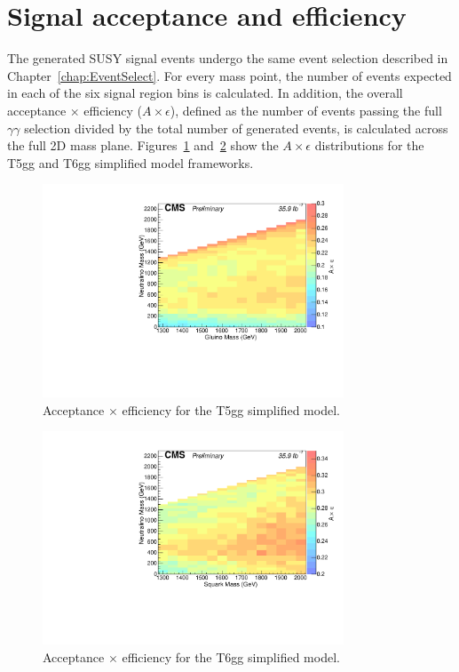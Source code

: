 
\section{Signal acceptance and efficiency}
The generated SUSY signal events undergo the same event selection described in Chapter~\ref{chap:EventSelect}. 
For every mass point, the number of events expected in each of the six signal region bins is calculated. 
In addition, the overall acceptance $\times$ efficiency ($A \times \epsilon$), defined as the number of events
passing the full $\gamma\gamma$ selection divided by the total number of generated events, is calculated across the 
full 2D mass plane. Figures~\ref{fig:accXeff_T5gg} and~\ref{fig:accXeff_T6gg} show the $A \times \epsilon$ distributions for the T5gg and T6gg simplified model 
frameworks.

\begin{figure}[h]
\begin{center}
\includegraphics[width=0.8\textwidth]{Figures/Results/accXeff_T5gg.pdf}
\end{center}
    \caption{Acceptance $\times$ efficiency for the T5gg simplified model.}
    \label{fig:accXeff_T5gg}
\end{figure}

\begin{figure}[h]
\begin{center}
\includegraphics[width=0.8\textwidth]{Figures/Results/accXeff_T6gg.pdf}
\end{center}
    \caption{Acceptance $\times$ efficiency for the T6gg simplified model.}
    \label{fig:accXeff_T6gg}
\end{figure}

